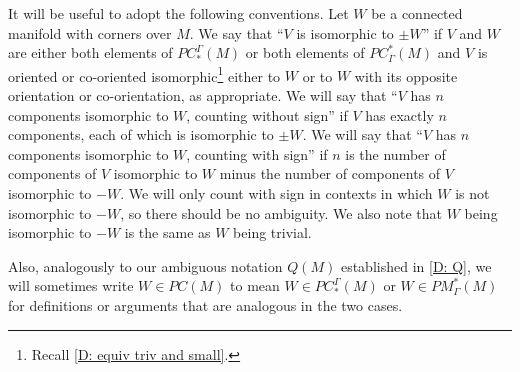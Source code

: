 It will be useful to adopt the following conventions.
Let $W$ be a connected manifold with corners over $M$.
We say that ``$V$ is isomorphic to $\pm W$'' if $V$ and $W$ are either both elements of $PC_*^\Gamma(M)$ or both elements of $PC^*_\Gamma(M)$ and $V$ is oriented or co-oriented isomorphic\footnote{Recall \cref{D: equiv triv and small}.} either to $W$ or to $W$ with its opposite orientation or co-orientation, as appropriate.
We will say that ``$V$ has $n$ components isomorphic to $W$, counting without sign'' if $V$ has exactly $n$ components, each of which is isomorphic to $\pm W$.
We will say that ``$V$ has $n$ components isomorphic to $W$, counting with sign'' if $n$ is the number of components of $V$ isomorphic to $W$ minus the number of components of $V$ isomorphic to $-W$.
We will only count with sign in contexts in which $W$ is not isomorphic to $-W$, so there should be no ambiguity.
We also note that $W$ being isomorphic to $-W$ is the same as $W$ being trivial.

Also, analogously to our ambiguous notation $Q(M)$ established in \cref{D: Q}, we will sometimes write $W \in PC(M)$ to mean $W \in PC^\Gamma_*(M)$ or $W \in PM_\Gamma^*(M)$ for definitions or arguments that are analogous in the two cases.


\begin{comment}
For example, consider a cochain represented by an element $V \in PC(M)$ that has a single connected component and small rank but whose boundary is not trivial or degenerate.
Suppose further that $V$ is transverse to some $W \in PC(M)$.
Then $(V,W)$ is a simply transverse pair.
But now if we replace $V$ with another connected element $V'$ that also has small rank but with $\bd V = \bd V'$, then $\uV = \underline{V'}$ as $V\sqcup-V' \in Q(M)$, and $V'$ may or may not be transverse to $W$, though $V'$ may be transverse to some other $W'$ with $\uW = \underline{W'}$.
There is some finer work to be done in showing that $V \times_M W $ and $V' \times_M W'$ represent the same (co)chain.
\end{comment}
\begin{comment}
	\red{REDO/MOVE THIS
		Once that is proven, basic results are immediate.
		NEED TO PROVE WITH SIGNS: Because categorical pullbacks are distributive, associative, and commutative, so will be the pullback product on geometric cochains and thus cohomology.
		The Leibniz rule implies that the product descends to cohomology, and we address that it is fully defined -- rather than partially defined as on cochains -- in \red{D: need to do this! probably goes at the end of this section - I say something there as well.}
		At the end of Section~5 of \cite{Lipy14} it is also stated without proof that pullback product coincides with the usual cup product.
		Traditionally the proof of such in the setting of intersections uses Thom isomorphisms,
		but a more explicit chain-level proof follows from our work on Section \ref{S: flow comparison theorem}.}
\end{comment}

